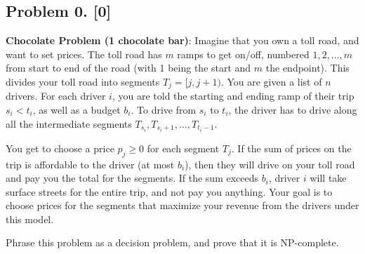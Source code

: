 \documentclass[10pt]{article}
\begin{document}
\subsection*{Problem 0. [0]}
\textbf{Chocolate Problem (1 chocolate bar)}: 
Imagine that you own a toll road, and want to set prices.
The toll road has $m$ ramps to get on/off, numbered $1, 2, \ldots, m$ from start to end of the road (with 1 being the start and $m$ the endpoint).
This divides your toll road into segments $T_j = [j,j+1)$.
You are given a list of $n$ drivers.
For each driver $i$, you are told the starting and ending ramp of their trip $s_i < t_i$, as well as a budget $b_i$. 
To drive from $s_i$ to $t_i$, the driver has to drive along all the intermediate segments $T_{s_i}, T_{s_i+1}, \ldots, T_{t_i-1}$.

You get to choose a price $p_j \geq 0$ for each segment $T_j$.
If the sum of prices on the trip is affordable to the driver (at most $b_i$), then they will drive on your toll road and pay you the total for the segments.
If the sum exceeds $b_i$, driver $i$ will take surface streets for the entire trip, and not pay you anything.
Your goal is to choose prices for the segments that maximize your revenue from the drivers under this model.

Phrase this problem as a decision problem, and prove that it is NP-complete. 
\end{document}
